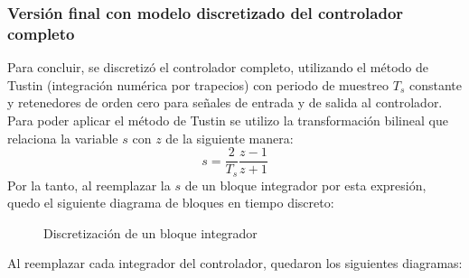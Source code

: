 \documentclass[a4paper, 10pt, onecolumn,journal]{ieeeconf}
\begin{document}
\subsubsection{\textbf{Versión final con modelo discretizado del controlador completo}} Para concluir, se discretizó el controlador completo, utilizando el método de Tustin (integración numérica por trapecios) con periodo de muestreo $T_s$ constante y retenedores de orden cero para señales de entrada y de salida al controlador.
Para poder aplicar el método de Tustin se utilizo la transformación bilineal que relaciona la variable $s$ con $z$ de la siguiente manera:
\begin{equation}
	s = \frac{2}{T_s} \frac{z-1}{z+1}
	\label{Transformación bilineal}
\end{equation}
Por la tanto, al reemplazar la $s$ de un bloque integrador por esta expresión, quedo el siguiente diagrama de bloques en tiempo discreto:
\begin{figure}[H]
	\centering
	\begin{adjustbox}{max width=\columnwidth}
	\end{adjustbox}
	\caption{Discretización de un bloque integrador}
	\label{Discretización de un bloque integrador}
\end{figure}
Al reemplazar cada integrador del controlador, quedaron los siguientes diagramas:
\end{document}
